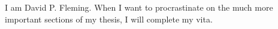 I am David P. Fleming. When I want to procrastinate on the much more important sections of my thesis, I will complete my vita.
